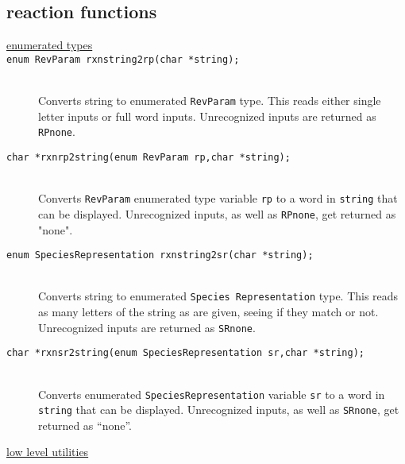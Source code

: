 \documentclass {book}
\begin{document}
\subsection*{reaction functions}

\begin{description}

\item[\underline{enumerated types}]

\item[\texttt{enum RevParam rxnstring2rp(char *string);}]
\hfill \\
Converts string to enumerated \texttt{RevParam} type.  This reads either single letter inputs or full word inputs.  Unrecognized inputs are returned as \texttt{RPnone}.

\item[\texttt{char *rxnrp2string(enum RevParam rp,char *string);}]
\hfill \\
Converts \texttt{RevParam} enumerated type variable \texttt{rp} to a word in \texttt{string} that can be displayed.  Unrecognized inputs, as well as \texttt{RPnone}, get returned as "none".

\item[\texttt{enum SpeciesRepresentation rxnstring2sr(char *string);}]
\hfill \\
Converts string to enumerated \texttt{Species Representation} type.  This reads as many letters of the string as are given, seeing if they match or not.  Unrecognized inputs are returned as \texttt{SRnone}.

\item[\texttt{char *rxnsr2string(enum SpeciesRepresentation sr,char *string);}]
\hfill \\
Converts enumerated \texttt{SpeciesRepresentation} variable \texttt{sr} to a word in \texttt{string} that can be displayed.  Unrecognized inputs, as well as \texttt{SRnone}, get returned as ``none''.

\item[\underline{low level utilities}]


\end{description}
\end{document}
